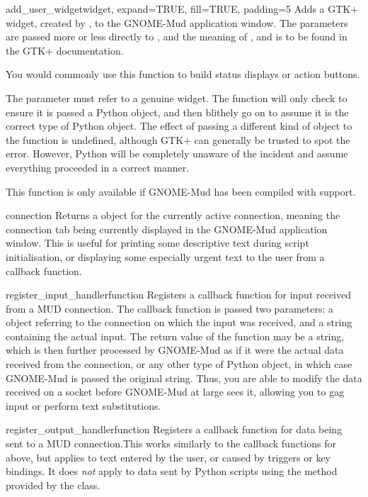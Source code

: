 \documentclass{howto}
\begin{document}
\begin{funcdesc}{add\_user\_widget}{widget, expand=TRUE, fill=TRUE, padding=5}
Adds a GTK+ widget, created by , to the GNOME-Mud application window. The parameters are passed
more or less directly to , and the meaning of ,  and 
is to be found in the GTK+ documentation.

You would commonly use this function to build status displays or action buttons.

 The  parameter must refer to a genuine  widget. The function will only check
to ensure it is passed a Python object, and then blithely go on to assume it is the correct type of Python object.
The effect of passing a different kind of object to the function is undefined, although GTK+ can generally be trusted
to spot the error. However, Python will be completely unaware of the incident and assume everything proceeded in a
correct manner.

This function is only available if GNOME-Mud has been compiled with  support.
\end{funcdesc}

\begin{funcdesc}{connection}{}
Returns a  object for the currently active connection, meaning the connection tab
being currently displayed in the GNOME-Mud application window. This is useful for printing some
descriptive text during script initialisation, or displaying some especially urgent text to the user
from a callback function.
\end{funcdesc}

\begin{funcdesc}{register\_input\_handler}{function}
Registers a callback function for input received from a MUD connection. The callback function is passed two
parameters: a  object referring to the connection on which the input was received, and
a string containing the actual input. The return value of the function may be a string, which is then
further processed by GNOME-Mud as if it were the actual data received from the connection, or any other
type of Python object, in which case GNOME-Mud is passed the original string. Thus, you are able to modify
the data received on a socket before GNOME-Mud at large sees it, allowing you to gag input or perform text
substitutions.
\end{funcdesc}

\begin{funcdesc}{register\_output\_handler}{function}
Registers a callback function for data being sent to a MUD connection.{\nobreakspace}This works similarly to the callback
functions for  above, but applies to text entered by the user, or caused by
triggers or key bindings. It does \emph{not} apply to data sent by Python scripts using the  method
provided by the  class.
\end{funcdesc}
\end{document}
